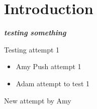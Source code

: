 \documentclass[10pt]{article}
\newcommand{\boldit}[1]{\textbf{\textit{#1}}}
\begin{document}
\section{Introduction}
\boldit{testing something}

Testing attempt 1
\begin{itemize}
  \item Amy Push attempt 1
  \item Adam attempt to test 1
\end{itemize}

New attempt by Amy
\end{document}
